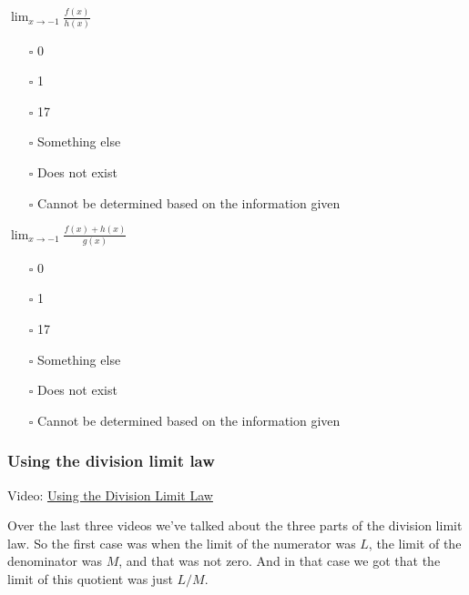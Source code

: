 \documentclass[pdftex, brazil, 12pt, twoside]{article}
\begin{document}
\begin{exercise}
  $\displaystyle \lim_{x \to -1}\frac{f(x)}{h(x)}$
  \begin{itemize}[noitemsep]
  \item[$\square$] 0
  \item[$\square$] 1
  \item[$\square$] 17
  \item[$\square$] Something else
  \item[$\square$] Does not exist
  \item[$\square$] Cannot be determined based on the information given
  \end{itemize}

  $\displaystyle \lim_{x \to -1}\frac{f(x)+h(x)}{g(x)}$
  \begin{itemize}[noitemsep]
  \item[$\square$] 0
  \item[$\square$] 1
  \item[$\square$] 17
  \item[$\square$] Something else
  \item[$\square$] Does not exist
  \item[$\square$] Cannot be determined based on the information given
  \end{itemize}
\end{exercise}

\subsubsection{Using the division limit law}
\label{u0-lim-quo-using-law}

Video: \href{https://www.youtube.com/watch?v=muI7-P0aBmI}{Using the Division Limit Law}

Over the last three videos we've talked about the three parts
of the division limit law.
So the first case was when the limit of the numerator was $L$,
the limit of the denominator was $M$, and that was not zero.
And in that case we got that the limit of this quotient
was just $L/M$.

\begin{figure}[H]
  \begin{center}
  \end{center}
\end{figure}
\end{document}
